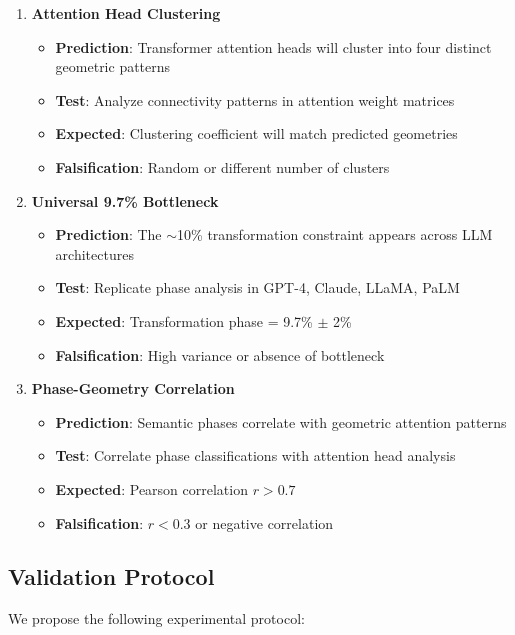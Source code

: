 \documentclass[mlmain]{jmlr}
\begin{document}
\begin{enumerate}
\item \textbf{Attention Head Clustering}
\begin{itemize}
\item \textbf{Prediction}: Transformer attention heads will cluster into four distinct geometric patterns
\item \textbf{Test}: Analyze connectivity patterns in attention weight matrices
\item \textbf{Expected}: Clustering coefficient will match predicted geometries
\item \textbf{Falsification}: Random or different number of clusters
\end{itemize}

\item \textbf{Universal 9.7\% Bottleneck}
\begin{itemize}
\item \textbf{Prediction}: The $\sim$10\% transformation constraint appears across LLM architectures
\item \textbf{Test}: Replicate phase analysis in GPT-4, Claude, LLaMA, PaLM
\item \textbf{Expected}: Transformation phase = 9.7\% $\pm$ 2\%
\item \textbf{Falsification}: High variance or absence of bottleneck
\end{itemize}

\item \textbf{Phase-Geometry Correlation}
\begin{itemize}
\item \textbf{Prediction}: Semantic phases correlate with geometric attention patterns
\item \textbf{Test}: Correlate phase classifications with attention head analysis
\item \textbf{Expected}: Pearson correlation $r > 0.7$
\item \textbf{Falsification}: $r < 0.3$ or negative correlation
\end{itemize}
\end{enumerate}

\subsection{Validation Protocol}

We propose the following experimental protocol:
\end{document}
